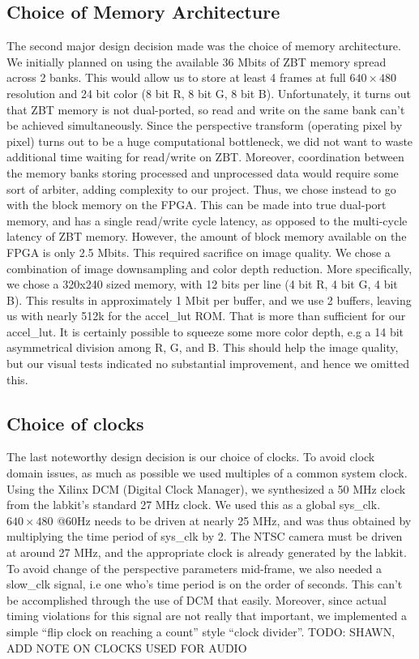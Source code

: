 \documentclass{article}
\begin{document}
\subsection{Choice of Memory Architecture}
The second major design decision made was the choice of memory architecture.
We initially planned on using the available 36 Mbits of ZBT memory spread across 2 banks.
This would allow us to store at least 4 frames at full $640 \times 480$  resolution and 24 bit color (8 bit R, 8 bit G, 8 bit B).
Unfortunately, it turns out that ZBT memory is not dual-ported, so read and write on the same bank can't be achieved simultaneously.
Since the perspective transform (operating pixel by pixel) turns out to be a huge computational bottleneck,
we did not want to waste additional time waiting for read/write on ZBT.
Moreover, coordination between the memory banks storing processed and unprocessed data would require some sort of arbiter, adding complexity to our project.
Thus, we chose instead to go with the block memory on the FPGA.
This can be made into true dual-port memory, and has a single read/write cycle latency, as opposed to the multi-cycle latency of ZBT memory.
However, the amount of block memory available on the FPGA is only 2.5 Mbits.
This required sacrifice on image quality.
We chose a combination of image downsampling and color depth reduction.
More specifically, we chose a 320x240 sized memory, with 12 bits per line (4 bit R, 4 bit G, 4 bit B).
This results in approximately 1 Mbit per buffer, and we use 2 buffers, leaving us with nearly 512k for the accel\_lut ROM.
That is more than sufficient for our accel\_lut.
It is certainly possible to squeeze some more color depth, e.g a 14 bit asymmetrical division among R, G, and B.
This should help the image quality, but our visual tests indicated no substantial improvement, and hence we omitted this.

\subsection{Choice of clocks}
The last noteworthy design decision is our choice of clocks.
To avoid clock domain issues, as much as possible we used multiples of a common system clock.
Using the Xilinx DCM (Digital Clock Manager), we synthesized a 50 MHz clock from the labkit's standard 27 MHz clock.
We used this as a global sys\_clk.
$640 \times 480$ @60Hz needs to be driven at nearly 25 MHz, and was thus obtained by multiplying the time period of sys\_clk by 2.
The NTSC camera must be driven at around 27 MHz, and the appropriate clock is already generated by the labkit.
To avoid change of the perspective parameters mid-frame, we also needed a slow\_clk signal,
i.e one who's time period is on the order of seconds.
This can't be accomplished through the use of DCM that easily.
Moreover, since actual timing violations for this signal are not really that important,
we implemented a simple ``flip clock on reaching a count'' style ``clock divider''.
TODO: SHAWN, ADD NOTE ON CLOCKS USED FOR AUDIO
\end{document}
